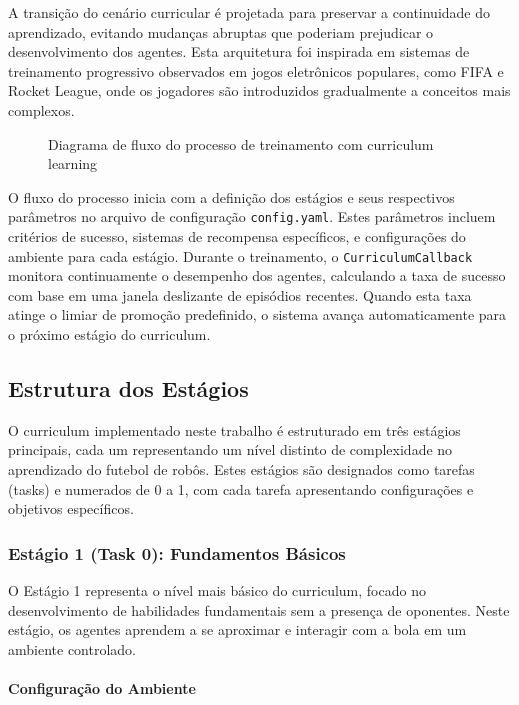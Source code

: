 A transição do cenário curricular é projetada para preservar a continuidade do aprendizado, evitando mudanças abruptas que poderiam prejudicar o desenvolvimento dos agentes. Esta arquitetura foi inspirada em sistemas de treinamento progressivo observados em jogos eletrônicos populares, como FIFA e Rocket League, onde os jogadores são introduzidos gradualmente a conceitos mais complexos.

\begin{figure}[H]
    \centering
    \caption{Diagrama de fluxo do processo de treinamento com curriculum learning}
    \label{fig:diagrama_curriculum}
\end{figure}

O fluxo do processo inicia com a definição dos estágios e seus respectivos parâmetros no arquivo de configuração \texttt{config.yaml}. Estes parâmetros incluem critérios de sucesso, sistemas de recompensa específicos, e configurações do ambiente para cada estágio. Durante o treinamento, o \texttt{CurriculumCallback} monitora continuamente o desempenho dos agentes, calculando a taxa de sucesso com base em uma janela deslizante de episódios recentes. Quando esta taxa atinge o limiar de promoção predefinido, o sistema avança automaticamente para o próximo estágio do curriculum.

\subsection{Estrutura dos Estágios}

O curriculum implementado neste trabalho é estruturado em três estágios principais, cada um representando um nível distinto de complexidade no aprendizado do futebol de robôs. Estes estágios são designados como tarefas (tasks) e numerados de 0 a 1, com cada tarefa apresentando configurações e objetivos específicos.

\subsubsection{Estágio 1 (Task 0): Fundamentos Básicos}
\label{subsubsec:estagio1}

O Estágio 1 representa o nível mais básico do curriculum, focado no desenvolvimento de habilidades fundamentais sem a presença de oponentes. Neste estágio, os agentes aprendem a se aproximar e interagir com a bola em um ambiente controlado.

\paragraph{Configuração do Ambiente}

